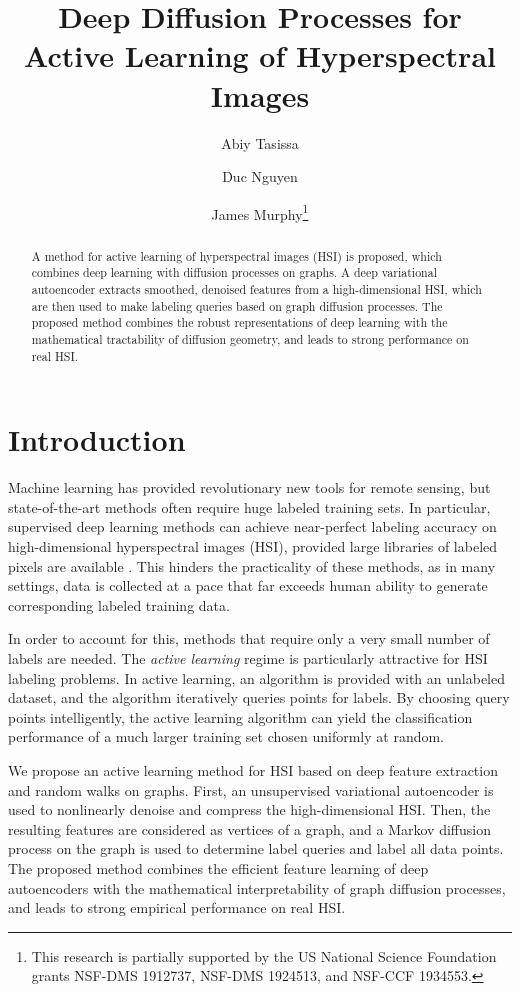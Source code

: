 \documentclass{article}
\title{Deep Diffusion Processes for Active Learning of Hyperspectral Images}
\author[1]{Abiy Tasissa}
\author[2]{Duc Nguyen}
\author[1]{James Murphy\thanks{This research is partially supported by the US National Science Foundation grants NSF-DMS 1912737, NSF-DMS 1924513, and NSF-CCF 1934553.}}
\affil[1]{Department of Mathematics, Tufts University, Medford, MA}
\affil[2]{Department of Mathematics, University of Maryland, College Park, USA}
\begin{document}
\maketitle

\begin{abstract} A method for active learning of hyperspectral images (HSI) is proposed, which combines deep learning with diffusion processes on graphs.  A deep variational autoencoder extracts smoothed, denoised features from a high-dimensional HSI, which are then used to make labeling queries based on graph diffusion processes.  The proposed method combines the robust representations of deep learning with the mathematical tractability of diffusion geometry, and leads to strong performance on real HSI.  

\end{abstract}


\section{Introduction}
\label{sec:Introduction}
 
 Machine learning has provided revolutionary new tools for remote sensing, but state-of-the-art methods often require huge labeled training sets.  In particular, supervised deep learning methods can achieve near-perfect labeling accuracy on high-dimensional hyperspectral images (HSI), provided large libraries of labeled pixels are available \cite{Zhu2017_Deep}.  This hinders the practicality of these methods, as in many settings, data is collected at a pace that far exceeds human ability to generate corresponding labeled training data.
 
 In order to account for this, methods that require only a very small number of labels are needed.  The \emph{active learning} regime is particularly attractive for HSI labeling problems.  In active learning, an algorithm is provided with an unlabeled dataset, and the algorithm iteratively queries points for labels.  By choosing query points intelligently, the active learning algorithm can yield the classification performance of a much larger training set chosen uniformly at random.  
 
We propose an active learning method for HSI based on deep feature extraction and random walks on graphs.  First, an unsupervised variational autoencoder is used to nonlinearly denoise and compress the high-dimensional HSI.  Then, the resulting features are considered as vertices of a graph, and a Markov diffusion process on the graph is used to determine label queries and label all data points.  The proposed method combines the efficient feature learning of deep autoencoders with the mathematical interpretability of graph diffusion processes, and leads to strong empirical performance on real HSI.  
\end{document}
